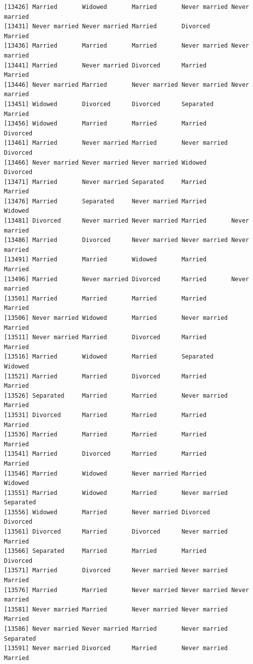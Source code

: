 \documentclass[
  letterpaper,
  DIV=11,
  numbers=noendperiod,
  oneside]{scrartcl}
\begin{document}
\begin{verbatim}
[13426] Married       Widowed       Married       Never married Never married
[13431] Never married Never married Married       Divorced      Married      
[13436] Married       Married       Married       Never married Never married
[13441] Married       Never married Divorced      Married       Married      
[13446] Never married Married       Never married Never married Never married
[13451] Widowed       Divorced      Divorced      Separated     Married      
[13456] Widowed       Married       Married       Married       Divorced     
[13461] Married       Never married Married       Never married Divorced     
[13466] Never married Never married Never married Widowed       Divorced     
[13471] Married       Never married Separated     Married       Married      
[13476] Married       Separated     Never married Married       Widowed      
[13481] Divorced      Never married Never married Married       Never married
[13486] Married       Divorced      Never married Never married Never married
[13491] Married       Married       Widowed       Married       Married      
[13496] Married       Never married Divorced      Married       Never married
[13501] Married       Married       Married       Married       Married      
[13506] Never married Widowed       Married       Never married Married      
[13511] Never married Married       Divorced      Married       Married      
[13516] Married       Widowed       Married       Separated     Widowed      
[13521] Married       Married       Divorced      Married       Married      
[13526] Separated     Married       Married       Never married Married      
[13531] Divorced      Married       Married       Married       Married      
[13536] Married       Married       Married       Married       Married      
[13541] Married       Divorced      Married       Married       Married      
[13546] Married       Widowed       Never married Married       Widowed      
[13551] Married       Widowed       Married       Never married Separated    
[13556] Widowed       Married       Never married Divorced      Divorced     
[13561] Divorced      Married       Divorced      Never married Married      
[13566] Separated     Married       Married       Married       Divorced     
[13571] Married       Divorced      Never married Never married Married      
[13576] Married       Married       Never married Never married Never married
[13581] Never married Married       Never married Never married Married      
[13586] Never married Never married Married       Never married Separated    
[13591] Never married Divorced      Married       Never married Married      

\end{verbatim}
\end{document}
